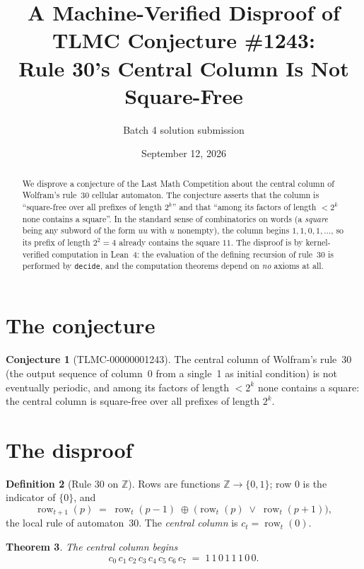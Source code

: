 \documentclass[11pt]{article}
\title{A Machine-Verified Disproof of TLMC Conjecture \#1243:\\ Rule 30's Central Column Is Not Square-Free}
\author{Batch 4 solution submission}
\date{September 12, 2026}
\newtheorem{theorem}{Theorem}[section]
\theoremstyle{definition}
\newtheorem{definition}[theorem]{Definition}
\newtheorem{conjecture}[theorem]{Conjecture}
\theoremstyle{remark}
\begin{document}
\maketitle

\begin{abstract}
We disprove a conjecture of the Last Math Competition about the central column of Wolfram's rule~30 cellular automaton. The conjecture asserts that the column is ``square-free over all prefixes of length $2^k$'' and that ``among its factors of length $< 2^k$ none contains a square''. In the standard sense of combinatorics on words (a \emph{square} being any subword of the form $uu$ with $u$ nonempty), the column begins $1, 1, 0, 1, \ldots$, so its prefix of length $2^2 = 4$ already contains the square $11$. The disproof is by kernel-verified computation in Lean~4: the evaluation of the defining recursion of rule~30 is performed by \texttt{decide}, and the computation theorems depend on \emph{no} axioms at all.
\end{abstract}

\section{The conjecture}

\begin{conjecture}[TLMC-00000001243]\label{conj:1243}
The central column of Wolfram's rule~30 (the output sequence of column~0 from a single~1 as initial condition) is not eventually periodic, and among its factors of length $< 2^k$ none contains a square: the central column is square-free over all prefixes of length $2^k$.
\end{conjecture}

\section{The disproof}

\begin{definition}[Rule 30 on $\mathbb{Z}$]
Rows are functions $\mathbb{Z} \to \{0,1\}$; row $0$ is the indicator of $\{0\}$, and
\[
\operatorname{row}_{t+1}(p) \;=\; \operatorname{row}_t(p-1) \;\oplus\; \bigl(\operatorname{row}_t(p) \;\vee\; \operatorname{row}_t(p+1)\bigr),
\]
the local rule of automaton~30. The \emph{central column} is $c_t = \operatorname{row}_t(0)$.
\end{definition}

\begin{theorem}\label{thm:values}
The central column begins
\[
c_0\, c_1\, c_2\, c_3\, c_4\, c_5\, c_6\, c_7 \;=\; 1\, 1\, 0\, 1\, 1\, 1\, 0\, 0 .
\]
\end{theorem}
\end{document}

